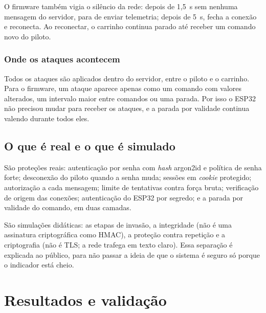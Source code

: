 \documentclass[12pt,openright,oneside,a4paper,english,brazil]{abntex2}
\begin{document}
O firmware também vigia o silêncio da rede: depois de 1,5~s sem nenhuma mensagem do servidor, para de enviar telemetria; depois de 5~s, fecha a conexão e reconecta. Ao reconectar, o carrinho continua parado até receber um comando novo do piloto.

\subsection{Onde os ataques acontecem}

Todos os ataques são aplicados dentro do servidor, entre o piloto e o carrinho. Para o firmware, um ataque aparece apenas como um comando com valores alterados, um intervalo maior entre comandos ou uma parada. Por isso o ESP32 não precisou mudar para receber os ataques, e a parada por validade continua valendo durante todos eles.

\section{O que é real e o que é simulado}

São proteções reais: autenticação por senha com \emph{hash} argon2id e política de senha forte; desconexão do piloto quando a senha muda; sessões em \emph{cookie} protegido; autorização a cada mensagem; limite de tentativas contra força bruta; verificação de origem das conexões; autenticação do ESP32 por segredo; e a parada por validade do comando, em duas camadas.

São simulações didáticas: as etapas de invasão, a integridade (não é uma assinatura criptográfica como HMAC), a proteção contra repetição e a criptografia (não é TLS; a rede trafega em texto claro). Essa separação é explicada ao público, para não passar a ideia de que o sistema é seguro só porque o indicador está cheio.

\chapter{Resultados e validação}
\end{document}
